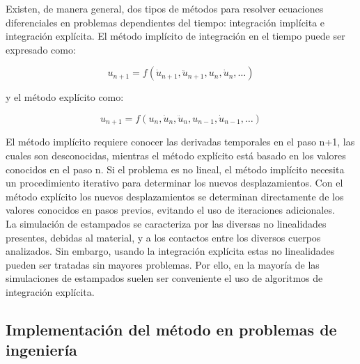 Existen, de manera general, dos tipos de métodos para resolver ecuaciones diferenciales  
en problemas dependientes del tiempo: integración implícita e integración explícita. El 
método implícito de integración en el tiempo puede ser expresado como: ~\cite{nielsen1997}

\begin{equation}
u_{n+1}=f(\dot{u}_{n+1},\ddot{u}_{n+1},u_n,\dot{u}_n,…)
\end{equation}

y el método explícito como:

\begin{equation}
u_{n+1}=f(u_n,\dot{u}_n,\ddot{u}_n,u_{n-1},\dot{u}_{n-1},…)
\end{equation}

El método implícito requiere conocer las derivadas temporales en el paso n+1, las cuales son desconocidas, 
mientras el método explícito está basado en los valores conocidos en el paso n. Si el problema es no 
lineal, el método implícito necesita un procedimiento iterativo para determinar los nuevos desplazamientos. 
Con el método explícito los nuevos desplazamientos se determinan directamente de los valores conocidos 
en pasos previos, evitando el uso de iteraciones adicionales.~\cite{nielsen1997}\\

La simulación de estampados se caracteriza por las diversas no linealidades presentes, debidas al 
material, y a los contactos entre los diversos cuerpos analizados. Sin embargo, usando la integración 
explícita estas no linealidades pueden ser tratadas sin mayores problemas. Por ello, en la mayoría de 
las simulaciones de estampados suelen ser conveniente el uso de algoritmos de integración explícita.


\subsection{Implementación del método en problemas de ingeniería}




